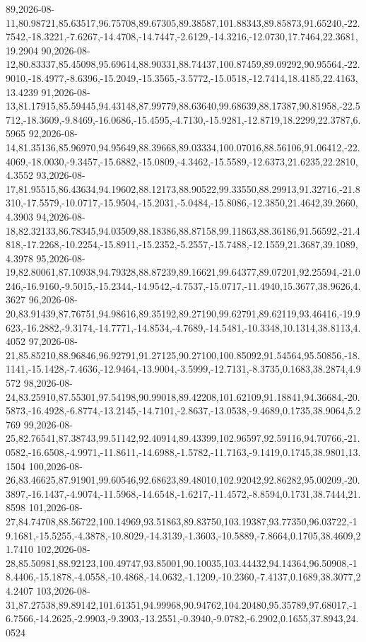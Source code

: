 \documentclass{eic-bcc-tcc}
\begin{document}
{89,2026-08-11,80.98721,85.63517,96.75708,89.67305,89.38587,101.88343,89.85873,91.65240,-22.7542,-18.3221,-7.6267,-14.4708,-14.7447,-2.6129,-14.3216,-12.0730,17.7464,22.3681,19.2904
90,2026-08-12,80.83337,85.45098,95.69614,88.90331,88.74437,100.87459,89.09292,90.95564,-22.9010,-18.4977,-8.6396,-15.2049,-15.3565,-3.5772,-15.0518,-12.7414,18.4185,22.4163,13.4239
91,2026-08-13,81.17915,85.59445,94.43148,87.99779,88.63640,99.68639,88.17387,90.81958,-22.5712,-18.3609,-9.8469,-16.0686,-15.4595,-4.7130,-15.9281,-12.8719,18.2299,22.3787,6.5965
92,2026-08-14,81.35136,85.96970,94.95649,88.39668,89.03334,100.07016,88.56106,91.06412,-22.4069,-18.0030,-9.3457,-15.6882,-15.0809,-4.3462,-15.5589,-12.6373,21.6235,22.2810,4.3552
93,2026-08-17,81.95515,86.43634,94.19602,88.12173,88.90522,99.33550,88.29913,91.32716,-21.8310,-17.5579,-10.0717,-15.9504,-15.2031,-5.0484,-15.8086,-12.3850,21.4642,39.2660,4.3903
94,2026-08-18,82.32133,86.78345,94.03509,88.18386,88.87158,99.11863,88.36186,91.56592,-21.4818,-17.2268,-10.2254,-15.8911,-15.2352,-5.2557,-15.7488,-12.1559,21.3687,39.1089,4.3978
95,2026-08-19,82.80061,87.10938,94.79328,88.87239,89.16621,99.64377,89.07201,92.25594,-21.0246,-16.9160,-9.5015,-15.2344,-14.9542,-4.7537,-15.0717,-11.4940,15.3677,38.9626,4.3627
96,2026-08-20,83.91439,87.76751,94.98616,89.35192,89.27190,99.62791,89.62119,93.46416,-19.9623,-16.2882,-9.3174,-14.7771,-14.8534,-4.7689,-14.5481,-10.3348,10.1314,38.8113,4.4052
97,2026-08-21,85.85210,88.96846,96.92791,91.27125,90.27100,100.85092,91.54564,95.50856,-18.1141,-15.1428,-7.4636,-12.9464,-13.9004,-3.5999,-12.7131,-8.3735,0.1683,38.2874,4.9572
98,2026-08-24,83.25910,87.55301,97.54198,90.99018,89.42208,101.62109,91.18841,94.36684,-20.5873,-16.4928,-6.8774,-13.2145,-14.7101,-2.8637,-13.0538,-9.4689,0.1735,38.9064,5.2769
99,2026-08-25,82.76541,87.38743,99.51142,92.40914,89.43399,102.96597,92.59116,94.70766,-21.0582,-16.6508,-4.9971,-11.8611,-14.6988,-1.5782,-11.7163,-9.1419,0.1745,38.9801,13.1504
100,2026-08-26,83.46625,87.91901,99.60546,92.68623,89.48010,102.92042,92.86282,95.00209,-20.3897,-16.1437,-4.9074,-11.5968,-14.6548,-1.6217,-11.4572,-8.8594,0.1731,38.7444,21.8598
101,2026-08-27,84.74708,88.56722,100.14969,93.51863,89.83750,103.19387,93.77350,96.03722,-19.1681,-15.5255,-4.3878,-10.8029,-14.3139,-1.3603,-10.5889,-7.8664,0.1705,38.4609,21.7410
102,2026-08-28,85.50981,88.92123,100.49747,93.85001,90.10035,103.44432,94.14364,96.50908,-18.4406,-15.1878,-4.0558,-10.4868,-14.0632,-1.1209,-10.2360,-7.4137,0.1689,38.3077,24.2407
103,2026-08-31,87.27538,89.89142,101.61351,94.99968,90.94762,104.20480,95.35789,97.68017,-16.7566,-14.2625,-2.9903,-9.3903,-13.2551,-0.3940,-9.0782,-6.2902,0.1655,37.8943,24.0524
}
\end{document}
